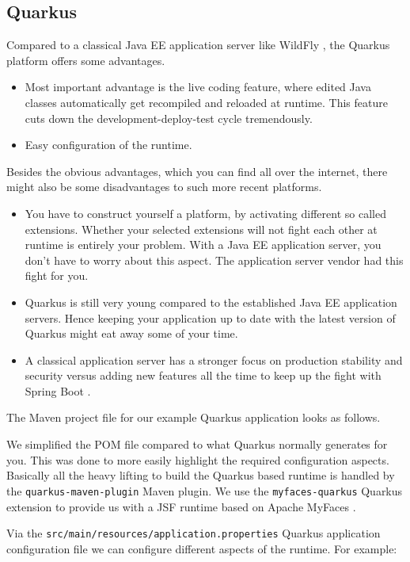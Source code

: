 \subsection{Quarkus}

Compared to a classical Java EE application server like WildFly \cite{WildFly}, the Quarkus \cite{quarkus} platform offers some advantages.
\begin{itemize}
	\item Most important advantage is the live coding feature, where edited Java classes automatically get recompiled and reloaded at runtime.
	This feature cuts down the development-deploy-test cycle tremendously.
	\item Easy configuration of the runtime.
\end{itemize}
Besides the obvious advantages, which you can find all over the internet, there might also be some disadvantages to such more recent platforms.
\begin{itemize}
	\item You have to construct yourself a platform, by activating different so called extensions.
	Whether your selected extensions will not fight each other at runtime is entirely your problem.
	With a Java EE application server, you don't have to worry about this aspect.
	The application server vendor had this fight for you.
	\item Quarkus is still very young compared to the established Java EE application servers.
	Hence keeping your application up to date with the latest version of Quarkus might eat away some of your time.
	\item A classical application server has a stronger focus on production stability and security versus adding new features all the time to keep up the fight with Spring Boot \cite{spring}.
\end{itemize}

The Maven project file for our example Quarkus application looks as follows.

We simplified the POM file compared to what Quarkus normally generates for you.
This was done to more easily highlight the required configuration aspects.
Basically all the heavy lifting to build the Quarkus based runtime is handled by the \texttt{quarkus-maven-plugin} Maven plugin.
We use the \texttt{myfaces-quarkus} Quarkus extension to provide us with a JSF runtime based on Apache MyFaces \cite{myfaces}.


Via the \texttt{src/main/resources/application.properties}  Quarkus application configuration file we can configure different aspects of the runtime. For example:


